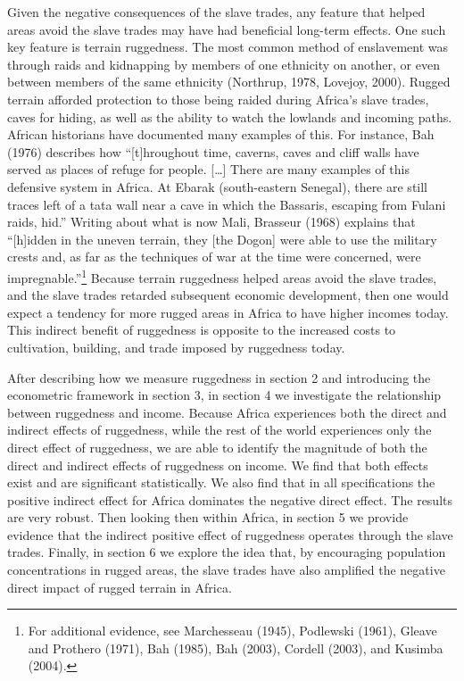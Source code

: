 \documentclass[
  letterpaper,
  DIV=11,
  numbers=noendperiod]{scrartcl}
\begin{document}
Given the negative consequences of the slave trades, any feature that
helped areas avoid the slave trades may have had beneficial long-term
effects. One such key feature is terrain ruggedness. The most common
method of enslavement was through raids and kidnapping by members of one
ethnicity on another, or even between members of the same ethnicity
(Northrup, 1978, Lovejoy, 2000). Rugged terrain afforded protection to
those being raided during Africa's slave trades, caves for hiding, as
well as the ability to watch the lowlands and incoming paths. African
historians have documented many examples of this. For instance, Bah
(1976) describes how ``{[}t{]}hroughout time, caverns, caves and cliff
walls have served as places of refuge for people. {[}\ldots{]} There are
many examples of this defensive system in Africa. At Ebarak
(south-eastern Senegal), there are still traces left of a tata wall near
a cave in which the Bassaris, escaping from Fulani raids, hid.'' Writing
about what is now Mali, Brasseur (1968) explains that ``{[}h{]}idden in
the uneven terrain, they {[}the Dogon{]} were able to use the military
crests and, as far as the techniques of war at the time were concerned,
were impregnable.''\footnote{For additional evidence, see Marchesseau
  (1945), Podlewski (1961), Gleave and Prothero (1971), Bah (1985), Bah
  (2003), Cordell (2003), and Kusimba (2004).} Because terrain
ruggedness helped areas avoid the slave trades, and the slave trades
retarded subsequent economic development, then one would expect a
tendency for more rugged areas in Africa to have higher incomes today.
This indirect benefit of ruggedness is opposite to the increased costs
to cultivation, building, and trade imposed by ruggedness today.

After describing how we measure ruggedness in section 2 and introducing
the econometric framework in section 3, in section 4 we investigate the
relationship between ruggedness and income. Because Africa experiences
both the direct and indirect effects of ruggedness, while the rest of
the world experiences only the direct effect of ruggedness, we are able
to identify the magnitude of both the direct and indirect effects of
ruggedness on income. We find that both effects exist and are
significant statistically. We also find that in all specifications the
positive indirect effect for Africa dominates the negative direct
effect. The results are very robust. Then looking then within Africa, in
section 5 we provide evidence that the indirect positive effect of
ruggedness operates through the slave trades. Finally, in section 6 we
explore the idea that, by encouraging population concentrations in
rugged areas, the slave trades have also amplified the negative direct
impact of rugged terrain in Africa.
\end{document}
